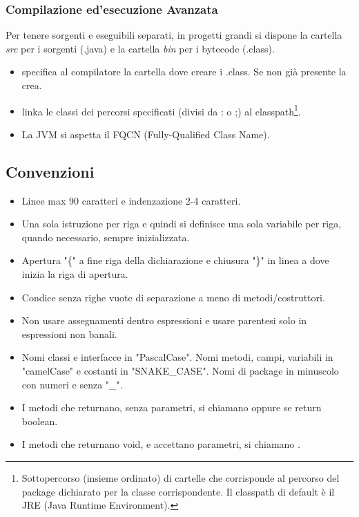 \subsubsection{Compilazione ed'esecuzione Avanzata}
Per tenere sorgenti e eseguibili separati, in progetti grandi si dispone la cartella \textit{src} per i sorgenti (.java) e la cartella \textit{bin} per i bytecode (.class).



\begin{itemize}
	\item {} specifica al compilatore la cartella dove creare i .class. Se non già presente la crea.
	\item {} linka le classi dei percorsi specificati (divisi da : o ;) al classpath\footnote{Sottopercorso (insieme ordinato) di cartelle che corrisponde al percorso del package dichiarato per la classe corrispondente. Il classpath di default è il JRE (Java Runtime Environment).}.
	\item La JVM si aspetta il FQCN (Fully-Qualified Class Name).
\end{itemize}

\subsection{Convenzioni}
\begin{itemize}
	\item Linee max 90 caratteri e indenzazione 2-4 caratteri.
	\item Una sola istruzione per riga e quindi si definisce una sola variabile per riga, quando necessario, sempre inizializzata.
	\item Apertura "\{" a fine riga della dichiarazione e chiusura "\}" in linea a dove inizia la riga di apertura.
	\item Condice senza righe vuote di separazione a meno di metodi/costruttori.
	\item Non usare assegnamenti dentro espressioni e usare parentesi solo in espressioni non banali.
	\item Nomi classi e interfacce in "PascalCase". Nomi metodi, campi, variabili in "camelCase" e costanti in "SNAKE\_CASE". Nomi di package in minuscolo con numeri e senza "\_".
	\bigskip
	\item I metodi che returnano, senza parametri, si chiamano  oppure  se return boolean.
	\item I metodi che returnano void, e accettano parametri, si chiamano .
\end{itemize}

